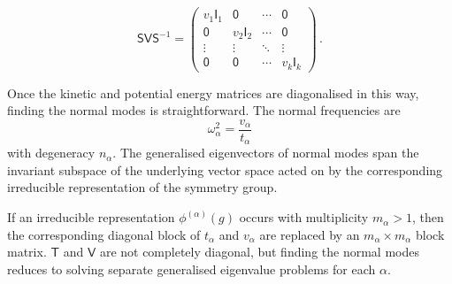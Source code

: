 \documentclass{article}
\theoremstyle{plain}\theoremheaderfont{\normalfont\itshape}\theorembodyfont{\rmfamily}\theoremseparator{.}\newtheorem*{rem}{Remark}\newtheorem*{ex}{Example}\newtheorem*{proof}{Proof}\newtheorem*{altp}{Alternative proof}
\theoremstyle{plain}\theoremheaderfont{\normalfont\bfseries}\theorembodyfont{\rmfamily}\theoremseparator{.}\newtheorem{thm}{Theorem}[section]\newtheorem{lem}[thm]{Lemma}\newtheorem{prop}[thm]{Proposition}\newtheorem*{cor}{Corollary}\newtheorem{defn}[thm]{Definition}\newtheorem{clm}[thm]{Claim}\newtheorem{clminproof}{Claim}
\theoremstyle{break}\theoremheaderfont{\normalfont\itshape}\theorembodyfont{\rmfamily}\theoremseparator{.\medskip}\newtheorem*{proofskip}{Proof}\newtheorem*{exs}{Examples}\newtheorem*{rems}{Remarks}
\theoremstyle{break}\theoremheaderfont{\normalfont\bfseries}\theorembodyfont{\rmfamily}\theoremseparator{.\medskip}\newtheorem{lemskip}[thm]{Lemma}\newtheorem{defnskip}[thm]{Definition}\newtheorem{propskip}[thm]{Proposition}\newtheorem{thmskip}[thm]{Theorem}
\numberwithin{equation}{section}
\begin{document}
	\[\mathsf{SVS}^{-1}=\begin{pmatrix}
		v_1\mathsf{I}_1 & \mathsf{0} & \cdots & \mathsf{0}\\
		\mathsf{0} & v_2\mathsf{I}_2 & \cdots & \mathsf{0}\\
		\vdots & \vdots & \ddots & \vdots\\
		\mathsf{0} & \mathsf{0} & \cdots & v_k\mathsf{I}_k
	\end{pmatrix}\,.\]

	Once the kinetic and potential energy matrices are diagonalised in this way, finding the normal modes is straightforward. The normal frequencies are
	\[\omega_\alpha^2=\frac{v_\alpha}{t_\alpha}\]
	with degeneracy \(n_\alpha\). The generalised eigenvectors of normal modes span the invariant subspace of the underlying vector space acted on by the corresponding irreducible representation of the symmetry group.

	If an irreducible representation \(\phi^{(\alpha)}(g)\) occurs with multiplicity \(m_\alpha >1\), then the corresponding diagonal block of \(t_\alpha\) and \(v_\alpha\) are replaced by an \(m_\alpha\times m_\alpha\) block matrix. \(\mathsf{T}\) and \(\mathsf{V}\) are not completely diagonal, but finding the normal modes reduces to solving separate generalised eigenvalue problems for each \(\alpha\).
\end{document}
